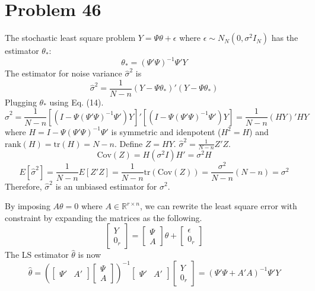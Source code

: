 \documentclass[a4paper, 11pt]{article}
\begin{document}
\section*{Problem 46}
The stochastic least square problem $Y = \Psi \theta + \epsilon$ where $\epsilon\sim N_N(0, \sigma^2I_N)$ has the estimator $\theta_*$: 
\begin{equation}
\theta_* = (\Psi ' \Psi)^{-1} \Psi ' Y 
\end{equation}
The estimator for noise variance $\hat{\sigma}^2$ is
\begin{equation}
\hat{\sigma}^2 = \frac{1}{N-n}(Y - \Psi\theta_*)'(Y - \Psi\theta_*)
\end{equation}
Plugging $\theta_*$ using Eq. (14). 
\begin{equation}
\hat{\sigma}^2 = \frac{1}{N-n}\left[(I - \Psi (\Psi ' \Psi)^{-1} \Psi ')Y \right]' \left[(I - \Psi (\Psi ' \Psi)^{-1} \Psi ')Y \right] = \frac{1}{N-n} (HY)'HY
\end{equation}
where $H = I - \Psi (\Psi ' \Psi)^{-1} \Psi '$ is symmetric and idenpotent ($H^2 = H$) and $\text{rank}(H) = \text{tr}(H) = N-n$. Define $Z = HY$. $\hat{\sigma}^2 = \frac{1}{N-n}Z'Z$.
\begin{equation}
\text{Cov}(Z) = H(\sigma^2 I)H' = \sigma^2 H
\end{equation}
\begin{equation}
E[\hat{\sigma}^2] = \frac{1}{N-n}E[Z'Z] = \frac{1}{N-n}\text{tr}(\text{Cov}(Z)) = \frac{\sigma^2}{N-n}(N-n) = \sigma^2
\end{equation}
Therefore, $\hat{\sigma}^2$ is an unbiased estimator for $\sigma^2$. 

By imposing $A\theta = 0$ where $A\in \mathbb{R}^{r\times n}$, we can rewrite the least square error with constraint by expanding the matrices as the following.
\begin{equation}
\begin{bmatrix}
Y\\
0_r
\end{bmatrix} = \begin{bmatrix}
\Psi \\
A
\end{bmatrix}\theta + \begin{bmatrix}
\epsilon \\
0_r
\end{bmatrix}
\end{equation}
The LS estimator $\hat{\theta}$ is now 
\begin{equation}
\hat{\theta} = \left(\begin{bmatrix}
\Psi' & A'
\end{bmatrix}\begin{bmatrix}
\Psi \\
A
\end{bmatrix} \right)^{-1} \begin{bmatrix}
\Psi' & A'
\end{bmatrix} \begin{bmatrix}
Y \\
0_r
\end{bmatrix} = \left(\Psi'\Psi + A'A \right)^{-1}\Psi'Y
\end{equation}
\end{document}
